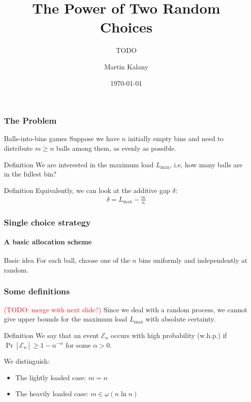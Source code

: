 \documentclass[serif,professionalfonts]{beamer}
\title{The Power of Two Random Choices}
\subtitle{TODO}
\author[M. Kalany]{Martin Kalany}
\institute[TU Wien]
{
  Graduate student in Computer Science\\
  Vienna University of Technology\\
}
\date{\today}
\newcommand\todo[1]{\textcolor{red}{(TODO: #1)}}
\newcommand\load{L_{\mathrm{max}}}
\newcommand\scalefac{0.55}
\newcommand\ballsize{5mm}
\newcommand\nrbins{6}
\newcommand\padding{0.1*\ballsize}
\newcommand\bingap{1.6*\balldiameter}
\newcommand\balldiameter{2*\ballsize}
\newcommand\iA[2][0]{
	\path (\nbid) edge[insert, bend left=#1] (#2);
}
\newcommand\bin[1]{
	\path node[topflat, xshift=#1*\bingap*\scalefac, above, yshift=-\padding*\scalefac]  {};
}
\newcommand\bins{
	\foreach \ibin in {1,...,\nrbins}
		\bin{\ibin};
}
\newcommand\setNode[2]{
	\draw let \n1 ={#1#2} in node[circle, minimum size = \ballsize](n\n1) at (#1*\bingap,#2*\balldiameter-\ballsize) {};
}
\newcommand\nodes{
	\foreach \i in {1,...,6}
		\foreach \j in {1,...,5}
			\setNode{\i}{\j};
}
\newcommand\ball[2]{
	\shade[ballstyle] (#1*\bingap,#2*\balldiameter-\ballsize) circle (\ballsize) {};
}
\newcommand\nbid{nb}
\newcommand\newball{
	\draw node[circle, minimum size = \ballsize](\nbid) at (0*\bingap,6*\balldiameter-\ballsize) {};
	\ball{0}{6};
}
\newcommand\putinbin[2]{
	\ifnum #2 > 0
		\foreach \nrballs in {1,...,#2}
 			\ball{#1}{\nrballs};
 	\fi
}
\newcounter{index}
\newcommand\balls[1]{%
	\getargsC{#1}%
  	\setcounter{index}{0}%
  	\whiledo{\theindex < \narg}{%
    		\stepcounter{index}%
    		\putinbin{\theindex}{\csname arg\romannumeral\theindex\endcsname}%
  	}%
}
\newcommand\bab[1]{%
	\bins
	\nodes
	\balls{#1}
}
\begin{document}
\begin{frame}
  \titlepage
\end{frame}
\note{}

\begin{frame}
\frametitle{The Problem}
\begin{exampleblock}{Balls-into-bins games}
Suppose we have $n$ initially empty bins and need to distribute $m \geq n$ balls among them, \alert{as evenly as possible}. 
\end{exampleblock}

\begin{exampleblock}{Definition}
We are interested in the \alert{maximum load $\load$}, i.e, how many balls are in the fullest bin?
\end{exampleblock}

\begin{exampleblock}{Definition}
Equivalently, we can look at the \alert{additive gap} $\delta$:
\begin{align*}
\delta = \load - \frac{m}{n}
\end{align*}
\end{exampleblock}
\end{frame}

\begin{frame}
\frametitle{Single choice strategy}
\framesubtitle{A basic allocation scheme}
\begin{exampleblock}{Basic idea}
For each ball, choose one of the $n$ bins \alert{uniformly and independently at random}.
\end{exampleblock}
\bigskip

\begin{center}
\end{center}
\end{frame}

\begin{frame}
\frametitle{Some definitions}
\todo{merge with next slide?}
Since we deal with a \alert{random process}, we cannot give upper bounds for the maximum load $\load$ with absolute certainty. 

\begin{exampleblock}{Definition}
We say that an event $\mathcal E_n$ occurs \alert{with high probability} (w.h.p.) if $\Pr\left[\mathcal E_n \right] \geq 1 - n^{-\alpha}$ for some $\alpha > 0$.
\end{exampleblock}

\bigskip

We distinguish:
\begin{itemize}
\item The \alert{lightly loaded} case: $m = n$
\item The \alert{heavily loaded} case:	 $m \in \omega(n\ln n)$
\end{itemize}
\end{frame}
\end{document}
